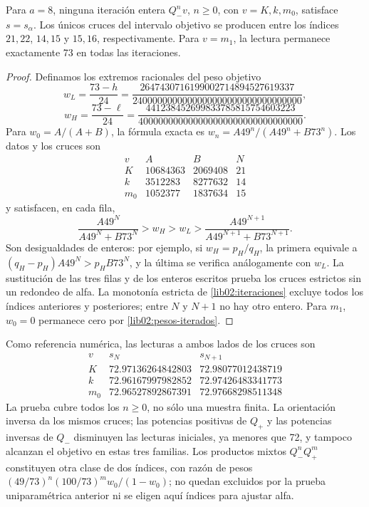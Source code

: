 \begin{proposition}
\label{lib02:cruces-enteros}
Para \(a=8\), ninguna iteración entera \(Q_-^nv\), \(n\geq0\),
con \(v=K,k,m_0\), satisface \(s=s_\alpha\). Los únicos cruces
del intervalo objetivo se producen entre los índices \(21,22\),
\(14,15\) y \(15,16\), respectivamente. Para \(v=m_1\), la
lectura permanece exactamente 73 en todas las iteraciones.
\end{proposition}
\begin{proof}
Definamos los extremos racionales del peso objetivo
\[
 w_L=\frac{73-h}{24}
 =\frac{2647430716199002714894527619337}
 {2400000000000000000000000000000000},
\]
\[
 w_H=\frac{73-\ell}{24}
 =\frac{441238452699833785815754603223}
 {400000000000000000000000000000000}.
\]
Para \(w_0=A/(A+B)\), la fórmula exacta es
\(w_n=A49^n/(A49^n+B73^n)\). Los datos y los cruces son
\[
\begin{array}{c|r|r|c}
 v&A&B&N\\\hline
 K&10684363&2069408&21\\
 k&3512283&8277632&14\\
 m_0&1052377&1837634&15
\end{array}
\]
y satisfacen, en cada fila,
\[
 \frac{A49^N}{A49^N+B73^N}>w_H>w_L>
 \frac{A49^{N+1}}{A49^{N+1}+B73^{N+1}}.
\]
Son desigualdades de enteros: por ejemplo, si
\(w_H=p_H/q_H\), la primera equivale a
\((q_H-p_H)A49^N>p_HB73^N\), y la última se verifica
análogamente con \(w_L\). La sustitución de las tres filas y de
los enteros escritos prueba los cruces estrictos sin un redondeo de
alfa. La monotonía estricta de \cref{lib02:iteraciones} excluye
todos los índices anteriores y posteriores; entre \(N\) y
\(N+1\) no hay otro entero. Para \(m_1\), \(w_0=0\) permanece
cero por \eqref{lib02:pesos-iterados}.
\end{proof}

Como referencia numérica, las lecturas a ambos lados de los cruces son
\[
\begin{array}{c|c|c}
 v&s_N&s_{N+1}\\\hline
 K&72.97136264842803&72.98077012438719\\
 k&72.96167997982852&72.97426483341773\\
 m_0&72.96527892867391&72.97668298511348
\end{array}
\]
La prueba cubre todos los \(n\geq0\), no sólo una muestra finita.
La orientación inversa da los mismos cruces; las potencias positivas de
\(Q_+\) y las potencias inversas de \(Q_-\) disminuyen las
lecturas iniciales, ya menores que 72, y tampoco alcanzan el objetivo
en estas tres familias. Los productos mixtos \(Q_-^nQ_+^m\)
constituyen otra clase de dos índices, con razón de pesos
\((49/73)^n(100/73)^m w_0/(1-w_0)\); no quedan excluidos por
la prueba uniparamétrica anterior ni se eligen aquí índices para ajustar
alfa.

